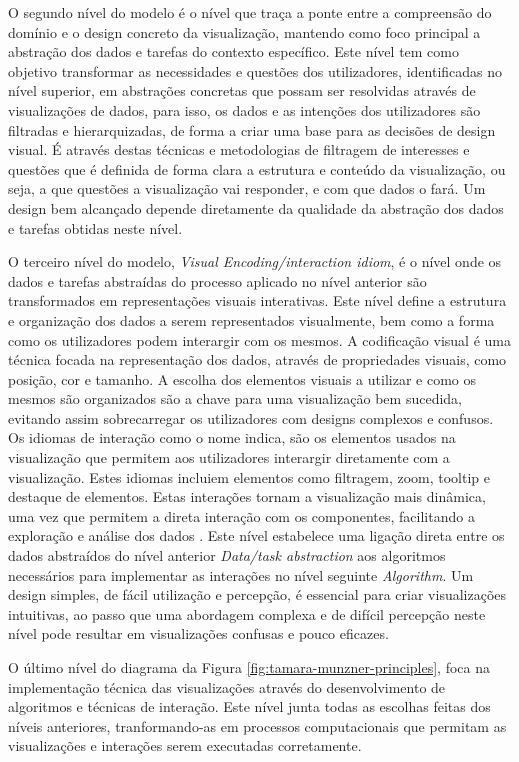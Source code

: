 O segundo nível do modelo é o nível que traça a ponte entre a compreensão do domínio e o design concreto da visualização, mantendo como foco principal a abstração dos dados e tarefas  do contexto específico. Este nível tem como objetivo transformar as necessidades e questões dos utilizadores, identificadas no nível superior, em abstrações concretas que possam ser resolvidas através de visualizações de dados, para isso, os dados e as intenções dos utilizadores são filtradas e hierarquizadas, de forma a criar uma base para as decisões de design visual. 
É através destas técnicas e metodologias de filtragem de interesses e questões que é definida de forma clara a estrutura e conteúdo da visualização, ou seja, a que questões a visualização vai responder, e com que dados o fará. Um design bem alcançado depende diretamente da qualidade da abstração dos dados e tarefas obtidas neste nível.

O terceiro nível do modelo, \textit{Visual Encoding/interaction idiom}, é o nível onde os dados e tarefas abstraídas do processo aplicado no nível anterior são transformados em representações visuais interativas. Este nível define a estrutura e organização dos dados a serem representados visualmente, bem como a forma como os utilizadores podem interargir com os mesmos.
A codificação visual é uma técnica focada na representação dos dados, através de propriedades visuais, como posição, cor e tamanho. A escolha dos elementos visuais a utilizar e como os mesmos são organizados são a chave para uma visualização bem sucedida, evitando assim sobrecarregar os utilizadores com designs complexos e confusos.
Os idiomas de interação como o nome indica, são os elementos usados na visualização que permitem aos utilizadores interargir diretamente com a visualização. Estes idiomas incluiem elementos como filtragem, zoom, tooltip e destaque de elementos. Estas interações tornam a visualização mais dinâmica, uma vez que permitem a direta interação com os componentes, facilitando a exploração e análise dos dados \cite{figueiras2015towards}.
Este nível estabelece uma ligação direta entre os dados abstraídos do nível anterior \textit{Data/task abstraction} aos algoritmos necessários para implementar as interações no nível seguinte \textit{Algorithm}. Um design simples, de fácil utilização e percepção, é essencial para criar visualizações intuitivas, ao passo que uma abordagem complexa e de difícil percepção neste nível pode resultar em visualizações confusas e pouco eficazes.

O último nível do diagrama da Figura \ref{fig:tamara-munzner-principles}, foca na implementação técnica das visualizações através do desenvolvimento de algoritmos e técnicas de interação. Este nível junta todas as escolhas feitas dos níveis anteriores, tranformando-as em processos computacionais que permitam as visualizações e interações serem executadas corretamente.

